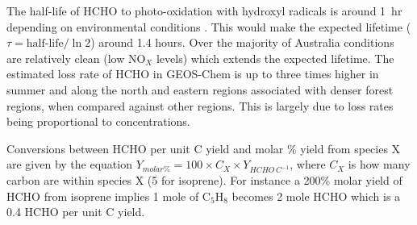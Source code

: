       
      The half-life of HCHO to photo-oxidation with hydroxyl radicals is around 1~hr depending on environmental conditions \parencite{WHO_hcho_guidelines_2010}.
      This would make the expected lifetime ($\tau = \text{half-life}/\ln{2}$) around 1.4 hours.
      Over the majority of Australia conditions are relatively clean (low NO$_X$ levels) which extends the expected lifetime.
      The estimated loss rate of HCHO in GEOS-Chem %
      is up to three times higher in summer and along the north and eastern regions associated with denser forest regions, when compared against other regions.
      This is largely due to loss rates being proportional to concentrations.
      
      Conversions between HCHO per unit C yield and molar \% yield from species X are given by the equation $ Y_{molar \%} = 100 \times C_X \times Y_{HCHO \,C^{-1}}$, where $C_X$ is how many carbon are within species X (5 for isoprene).
      For instance a 200\% molar yield of HCHO from isoprene implies 1 mole of C$_5$H$_8$ becomes 2 mole HCHO which is a 0.4 HCHO per unit C yield.
      
